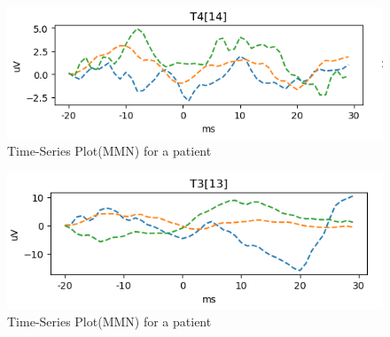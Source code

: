 \documentclass[conference]{IEEEconf}
\begin{document}
\begin{figure}
  \includegraphics{simiat_temporal.png}
  \caption{Time-Series Plot(MMN) for a patient} 
  \label{fig:MMN time-series plota}
\end{figure}

\begin{figure}
  \includegraphics{simiat_temporal1.png}
  \caption{Time-Series Plot(MMN) for a patient} 
  \label{fig:MMN time-series plot}
\end{figure}
\end{document}

